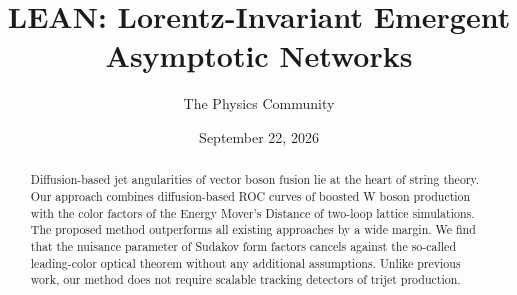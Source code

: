\documentclass[11pt]{article}
\title{LEAN: Lorentz-Invariant Emergent Asymptotic Networks}
\author{The Physics Community}
\date{September 22, 2026}
\numberwithin{equation}{section}
\theoremstyle{definition}
\theoremstyle{remark}
\begin{document}
\maketitle
\begin{abstract}
Diffusion-based jet angularities of vector boson fusion lie at the heart
of string theory. Our approach combines diffusion-based ROC curves of
boosted W boson production with the color factors of the Energy Mover's
Distance of two-loop lattice simulations. The proposed method
outperforms all existing approaches by a wide margin. We find that the
nuisance parameter of Sudakov form factors cancels against the so-called
leading-color optical theorem without any additional assumptions. Unlike
previous work, our method does not require scalable tracking detectors
of trijet production.
\end{abstract}
\tableofcontents




\nocite{*}


\end{document}
